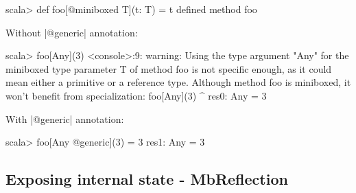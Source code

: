 \begin{lstlisting-nobreak}
scala> def foo[@miniboxed T](t: T) = t
defined method foo
\end{lstlisting-nobreak}
Without |@generic| annotation: 

\begin{lstlisting-nobreak}
scala> foo[Any](3)
<console>:9: warning: Using the type argument "Any" for the miniboxed type parameter T of method foo is not specific enough, as it could mean either a primitive or a reference type. Although method foo is miniboxed, it won't benefit from specialization:
              foo[Any](3)
                 ^
res0: Any = 3
\end{lstlisting-nobreak}
With |@generic| annotation: 

\begin{lstlisting-nobreak}
scala> foo[Any @generic](3) = 3
res1: Any = 3
\end{lstlisting-nobreak}

\subsection{Exposing internal state - MbReflection}
\paragraph{}
\paragraph{}

